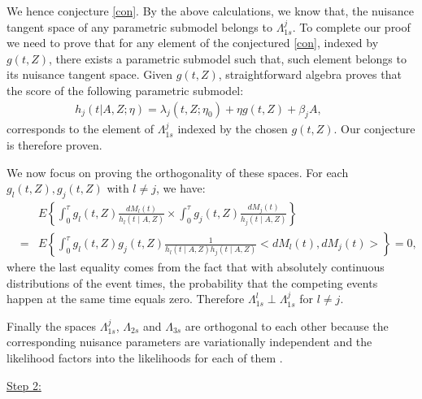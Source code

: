 \documentclass[11pt]{article}
\newcommand{\ee}{\end{eqnarray}}
\newcommand{\eqnn}{\begin{eqnarray*}}
\newcommand{\een}{\end{eqnarray*}}
\newcommand{\be}{\begin{eqnarray}}
\begin{document}
We hence conjecture \eqref{con}.
By the above calculations, we know that, the nuisance tangent space of any parametric submodel belongs to $\Lambda^j_{1s}$. 
To complete our proof we need to prove that for any element of the conjectured \eqref{con}, indexed by $g(t,Z)$, there exists a parametric submodel such that, such element belongs to its nuisance tangent space. 
Given $g(t,Z)$, straightforward algebra proves that the score of the following parametric submodel:
\eqnn
h_j(t | A,Z ; \eta)=\lambda_{j}(t,Z; \eta_0) +\eta g(t,Z) + \beta_j A, \;\;\;\;\;\;\;\;
\een
corresponds to the element of $\Lambda^j_{1s}$ indexed by the chosen $g(t,Z)$.
Our conjecture is therefore proven.

We now focus on proving the orthogonality of these spaces.
For each $g_l(t,Z),g_j(t,Z)$ with $l\neq j$, we have:
\eqnn
&&E\left\{\int_0^\tau g_l(t,Z) \frac{dM_l(t)}{h_l(t \mid A,Z)} \times \int_0^\tau g_j(t,Z) \frac{dM_j(t)}{h_j(t \mid A,Z)}\right\}\\
&=&E\left\{\int_0^\tau g_l(t,Z)g_j(t,Z) \frac{1}{h_l(t \mid A,Z)h_j(t \mid A,Z)} <dM_l(t),dM_j(t)>\right\}=0,
\een
where the last equality comes from the fact that with absolutely continuous distributions of the event times, the probability that the competing events happen at the same time equals zero.
Therefore $\Lambda_{1s}^l \perp \Lambda_{1s}^j$ for $l\neq j$.

Finally the spaces $\Lambda_{1s}^j$, $\Lambda_{2s}$ and $\Lambda_{3s}$ are orthogonal to each other because the corresponding nuisance parameters are variationally independent and the likelihood factors into the likelihoods for each of them \citep{tsiatis2007semiparametric}. 



\underline{Step 2:}
\end{document}
